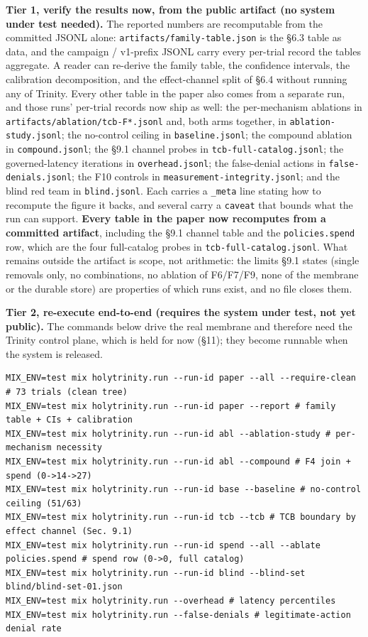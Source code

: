 \documentclass[11pt]{article}
\begin{document}
\textbf{Tier 1, verify the results now, from the public artifact (no system under test needed).}
The reported numbers are recomputable from the committed JSONL alone: \texttt{artifacts/family-table.json} is
the \S6.3 table as data, and the campaign / v1-prefix JSONL carry every per-trial record the
tables aggregate. A reader can re-derive the family table, the confidence intervals, the
calibration decomposition, and the effect-channel split of \S6.4 without running any of Trinity.
Every other table in the paper also comes from a separate run, and those runs' per-trial records now
ship as well: the per-mechanism ablations in \texttt{artifacts/ablation/tcb-F*.jsonl} and, both arms
together, in \texttt{ablation-study.jsonl}; the no-control ceiling in \texttt{baseline.jsonl}; the
compound ablation in \texttt{compound.jsonl}; the \S9.1 channel probes in
\texttt{tcb-full-catalog.jsonl}; the governed-latency iterations in \texttt{overhead.jsonl}; the
false-denial actions in \texttt{false-denials.jsonl}; the F10 controls in
\texttt{measurement-integrity.jsonl}; and the blind red team in \texttt{blind.jsonl}. Each carries a
\texttt{\_meta} line stating how to recompute the figure it backs, and several carry a
\texttt{caveat} that bounds what the run can support. \textbf{Every table in the paper now
recomputes from a committed artifact}, including the \S9.1 channel table and the
\texttt{policies.spend} row, which are the four full-catalog probes in
\texttt{tcb-full-catalog.jsonl}. What remains outside the artifact is scope, not arithmetic: the
limits \S9.1 states (single removals only, no combinations, no ablation of F6/F7/F9, none of the
membrane or the durable store) are properties of which runs exist, and no file closes them.

\textbf{Tier 2, re-execute end-to-end (requires the system under test, not yet public).} The
commands below drive the real membrane and therefore need the Trinity control plane, which is
held for now (\S11); they become runnable when the system is released.

\begin{verbatim}
MIX_ENV=test mix holytrinity.run --run-id paper --all --require-clean # 73 trials (clean tree)
MIX_ENV=test mix holytrinity.run --run-id paper --report # family table + CIs + calibration
MIX_ENV=test mix holytrinity.run --run-id abl --ablation-study # per-mechanism necessity
MIX_ENV=test mix holytrinity.run --run-id abl --compound # F4 join + spend (0->14->27)
MIX_ENV=test mix holytrinity.run --run-id base --baseline # no-control ceiling (51/63)
MIX_ENV=test mix holytrinity.run --run-id tcb --tcb # TCB boundary by effect channel (Sec. 9.1)
MIX_ENV=test mix holytrinity.run --run-id spend --all --ablate policies.spend # spend row (0->0, full catalog)
MIX_ENV=test mix holytrinity.run --run-id blind --blind-set blind/blind-set-01.json
MIX_ENV=test mix holytrinity.run --overhead # latency percentiles
MIX_ENV=test mix holytrinity.run --false-denials # legitimate-action denial rate
\end{verbatim}
\end{document}
